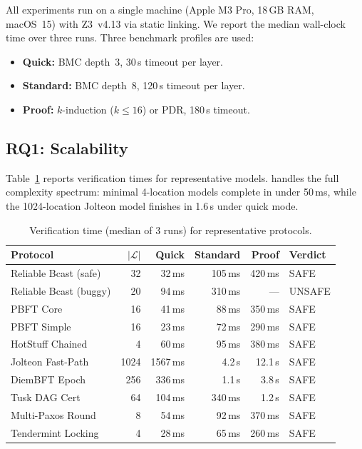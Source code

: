 All experiments run on a single machine (Apple M3 Pro, 18\,GB RAM,
macOS~15) with Z3~v4.13 via static linking.  We report the median
wall-clock time over three runs.  Three benchmark profiles are used:
\begin{itemize}
  \item \textbf{Quick:} BMC depth~3, 30\,s timeout per layer.
  \item \textbf{Standard:} BMC depth~8, 120\,s timeout per layer.
  \item \textbf{Proof:} $k$-induction ($k {\leq} 16$) or PDR,
    180\,s timeout.
\end{itemize}

\subsection{RQ1: Scalability}

Table~\ref{tab:timing} reports verification times for representative
models.  \tarsier{} handles the full complexity spectrum: minimal
4-location models complete in under 50\,ms, while the 1024-location
Jolteon model finishes in 1.6\,s under quick mode.

\begin{table}[t]
\centering
\caption{Verification time (median of 3 runs) for representative
protocols.}
\label{tab:timing}
\begin{tabular}{@{}lrrrrl@{}}
\toprule
\textbf{Protocol} & $|\mathcal{L}|$ &
  \textbf{Quick} & \textbf{Standard} & \textbf{Proof} & \textbf{Verdict} \\
\midrule
Reliable Bcast (safe)   &   32 &  32\,ms  & 105\,ms & 420\,ms & SAFE \\
Reliable Bcast (buggy)  &   20 &  94\,ms  & 310\,ms & ---     & UNSAFE \\
PBFT Core               &   16 &  41\,ms  &  88\,ms & 350\,ms & SAFE \\
PBFT Simple             &   16 &  23\,ms  &  72\,ms & 290\,ms & SAFE \\
HotStuff Chained        &    4 &  60\,ms  &  95\,ms & 380\,ms & SAFE \\
Jolteon Fast-Path       & 1024 & 1567\,ms & 4.2\,s  & 12.1\,s & SAFE \\
DiemBFT Epoch           &  256 & 336\,ms  & 1.1\,s  &  3.8\,s & SAFE \\
Tusk DAG Cert           &   64 & 104\,ms  & 340\,ms & 1.2\,s  & SAFE \\
Multi-Paxos Round       &    8 &  54\,ms  &  92\,ms & 370\,ms & SAFE \\
Tendermint Locking      &    4 &  28\,ms  &  65\,ms & 260\,ms & SAFE \\
\bottomrule
\end{tabular}
\end{table}

